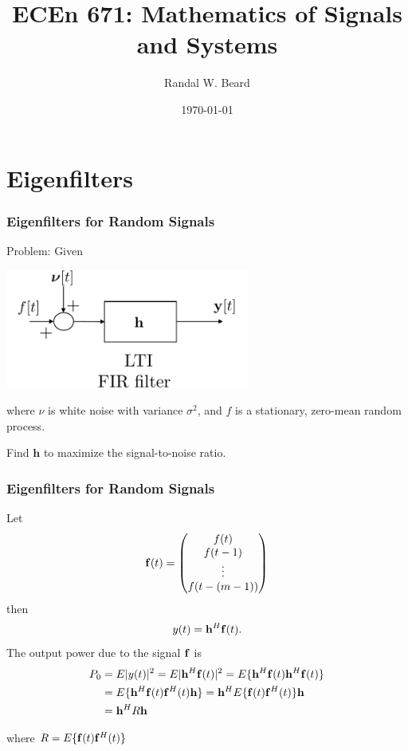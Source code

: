 \documentclass{beamer}
\title{ECEn 671: Mathematics of Signals and Systems}
\author{Randal W. Beard}
\institute{Brigham Young University}
\date{\today}
\begin{document}
\begin{frame}
	\titlepage
\end{frame}



\section{Eigenfilters}
\frame{\sectionpage}

\begin{frame}\frametitle{Eigenfilters for Random Signals}
	{\color{blue}Problem:}
	Given
	\begin{center}
		\includegraphics[width=0.6\textwidth]{figures/chap6_eigenfilter}
	\end{center}
	where $\nu$ is white noise with variance $\sigma^2$, and $f$ is a stationary, zero-mean random process.
	
	\vfill
	
	Find $\mathbf{h}$ to maximize the signal-to-noise ratio.
\end{frame}

\begin{frame}\frametitle{Eigenfilters for Random Signals}
	Let
	\[
		\mathbf{f}(t) 
			= \begin{pmatrix}
	    		f(t)\\
	    		f(t-1)\\
	    		\vdots\\
	    		f(t-(m-1))
	  		  \end{pmatrix}
	\]
	then
	\[ 
		y(t) = \mathbf{h}^H \mathbf{f}(t).
	\]
	The output power due to the signal $\mathbf{f}$ is 
	\begin{align*}
		P_0 
		&= E|y(t)|^2 = E|\mathbf{h}^H\mathbf{f}(t)|^2 = E\{\mathbf{h}^H\mathbf{f}(t)\mathbf{h}^H\mathbf{f}(t)\}\\
		&= E\{\mathbf{h}^H\mathbf{f}(t)\mathbf{f}^H(t)\mathbf{h}\}= \mathbf{h}^HE\{\mathbf{f}(t)\mathbf{f}^H(t)\}\mathbf{h}\\
		&= \mathbf{h}^HR\mathbf{h}
	\end{align*}
	
	where $R = E\{\mathbf{f}(t) \mathbf{f}^H(t)\} $
\end{frame}
\end{document}
